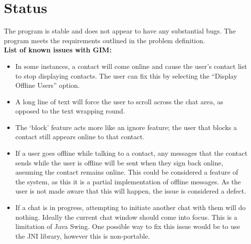 \documentclass{article}
\begin{document}
\section{Status}

The program is stable and does not appear to have any substantial bugs. The program meets the requirements outlined in the problem definition. \\

{\bf List of known issues with GIM:}
\begin{itemize}

\item{In some instances, a contact will come online and cause the user's contact list to stop displaying contacts. The user can fix this by selecting the ``Display Offline Users'' option.}

\item{A long line of text will force the user to scroll across the chat area, as opposed to the text wrapping round.}

\item{The `block' feature acts more like an ignore feature; the user that blocks a contact still appears online to that contact.}

\item{If a user goes offline while talking to a contact, any messages that the contact sends while the user is offline will be sent when they sign back online, assuming the contact remains online. This could be considered a feature of the system, as this it is a partial implementation of offline messages. As the user is not made aware that this will happen, the issue is considered a defect.}

\item{If a chat is in progress, attempting to initiate another chat with them will do nothing. Ideally the current chat window should come into focus. This is a limitation of Java Swing. One possible way to fix this issue would be to use the JNI library, however this is non-portable.}

\end{itemize}
\end{document}
